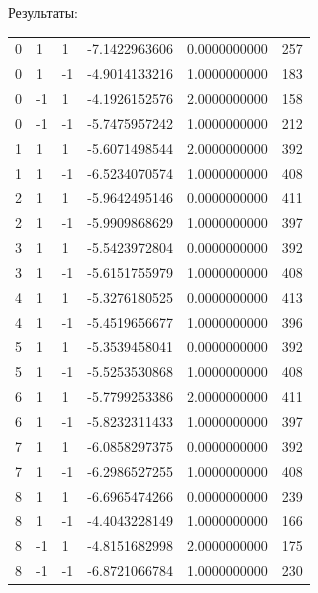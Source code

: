 \documentclass[11pt]{article}
\begin{document}
Результаты: \\
\begin{tabular}{llllll}
    0 &   1   &  1  &  -7.1422963606   &  0.0000000000  &       257 \\
    0 &    1 &   -1 &   -4.9014133216  &   1.0000000000 &       183 \\
    0 &   -1 &    1 &   -4.1926152576  &  2.0000000000   &     158 \\
    0 &   -1 &   -1 &   -5.7475957242  &  1.0000000000  &      212 \\
    1 &    1 &    1 &   -5.6071498544  &   2.0000000000 &       392 \\
    1 &    1 &   -1 &   -6.5234070574  &   1.0000000000 &       408 \\
    2 &    1 &    1 &   -5.9642495146  &   0.0000000000 &       411 \\
    2 &    1 &   -1 &   -5.9909868629  &   1.0000000000 &       397 \\
    3 &    1 &    1 &   -5.5423972804  &   0.0000000000 &       392 \\
    3 &    1 &   -1 &   -5.6151755979  &   1.0000000000 &       408 \\
    4 &    1 &    1 &   -5.3276180525  &   0.0000000000 &       413 \\
    4 &    1 &   -1 &   -5.4519656677  &   1.0000000000 &       396 \\
    5 &    1 &    1 &   -5.3539458041  &   0.0000000000 &       392 \\
    5 &    1 &   -1 &   -5.5253530868  &   1.0000000000 &       408 \\
    6 &    1 &    1 &   -5.7799253386  &   2.0000000000 &       411 \\
    6 &    1 &   -1 &   -5.8232311433  &   1.0000000000 &       397 \\
    7 &    1 &    1 &   -6.0858297375  &   0.0000000000 &       392 \\
    7 &    1 &   -1 &   -6.2986527255  &   1.0000000000 &       408 \\
    8 &    1 &    1 &   -6.6965474266  &   0.0000000000 &       239 \\
    8 &    1 &   -1 &   -4.4043228149  &   1.0000000000 &       166 \\
    8 &   -1 &    1 &   -4.8151682998  &   2.0000000000 &       175 \\
    8 &   -1 &   -1 &   -6.8721066784  &   1.0000000000 &       230 \\
\end{tabular}
\end{document}
